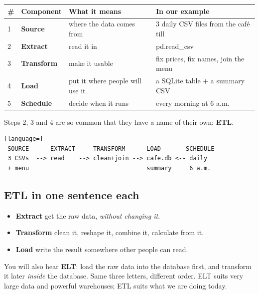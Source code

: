 \documentclass[11pt,letterpaper]{article}
\newcommand{\py}[1]{{\ttfamily\small#1}}
\begin{document}
{\sffamily\footnotesize
\begin{tabular}{@{}p{0.5cm}p{2.3cm}p{5.0cm}p{5.4cm}@{}}
\toprule
\textbf{\#} & \textbf{Component} & \textbf{What it means} & \textbf{In our example} \\
\midrule
1 & \textbf{Source}    & where the data comes from       & 3 daily CSV files from the caf\'e till \\
2 & \textbf{Extract}   & read it in                      & \py{pd.read\_csv} \\
3 & \textbf{Transform} & make it usable                  & fix prices, fix names, join the menu \\
4 & \textbf{Load}      & put it where people will use it & a SQLite table + a summary CSV \\
5 & \textbf{Schedule}  & decide when it runs             & every morning at 6 a.m. \\
\bottomrule
\end{tabular}}

\vspace{6pt}
Steps 2, 3 and 4 are so common that they have a name of their own: \textbf{ETL}.

\begin{lstlisting}[language=]
 SOURCE      EXTRACT     TRANSFORM      LOAD       SCHEDULE
 3 CSVs  --> read    --> clean+join --> cafe.db <-- daily
 + menu                                 summary     6 a.m.
\end{lstlisting}

\subsection{ETL in one sentence each}

\begin{itemize}
  \item \textbf{Extract} \textemdash{} get the raw data, \emph{without changing it}.
  \item \textbf{Transform} \textemdash{} clean it, reshape it, combine it, calculate from it.
  \item \textbf{Load} \textemdash{} write the result somewhere other people can read.
\end{itemize}

\begin{greybox}
\small
You will also hear \textbf{ELT}: load the raw data into the database first, and transform it later
\emph{inside} the database. Same three letters, different order. ELT suits very large data and
powerful warehouses; ETL suits what we are doing today.
\end{greybox}
\end{document}
